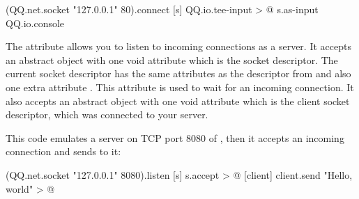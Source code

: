 \documentclass[sigplan,nonacm]{acmart}
\newcommand\aff[1]{\ff{\textcolor{gray}{\(\star\)}#1}}
\newcommand\deff[1]{\ff{\textcolor{blue!50!black}{\textbf{#1}}}}
\newcommand\adeff[1]{\aff{\textcolor{blue!50!black}{\textbf{#1}}}}
\begin{document}
\begin{ffcode}
(QQ.net.socket "127.0.0.1" 80).connect
  [s]
    QQ.io.tee-input > @
      s.as-input
      QQ.io.console
\end{ffcode}

The \adeff{listen} attribute allows you to listen to incoming connections as a server.
It accepts an abstract object with one void attribute which is the socket descriptor. The current socket descriptor has the
same attributes as the descriptor from  and also one extra attribute \deff{accept}. This attribute is
used to wait for an incoming connection. It also accepts an abstract object with one void attribute which is the client socket descriptor,
which was connected to your server.

This code emulates a server on TCP port 8080 of , then it accepts an incoming connection and sends  to it:

\begin{ffcode}
(QQ.net.socket "127.0.0.1" 8080).listen
  [s]
    s.accept > @
      [client]
        client.send "Hello, world" > @
\end{ffcode}

\raggedright


\end{document}
